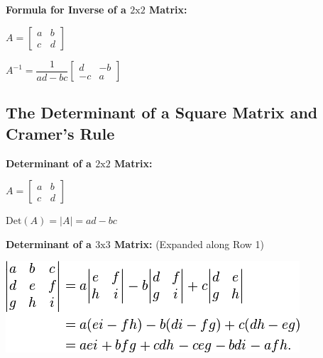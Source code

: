 \documentclass[12pt]{article}
\newenvironment{myindentpar}[1]%
     {\begin{list}{}%
             {\setlength{\leftmargin}{#1}}%
             \item[]%
     }
     {\end{list}}
\begin{document}
\newpage


\textbf{Formula for Inverse of a $2\text{x}2$ Matrix:}
\newline

\begin{myindentpar}{1cm}
\vspace{.5cm}
\centerline{
$ A = \begin{bmatrix}                                        
       a & b           \\[.5em]			
       c& d   		
     \end{bmatrix}$}
\end{myindentpar}

\begin{myindentpar}{1cm}
\vspace{.5cm}
\centerline{
$A^{-1} = \dfrac{1}{ad-bc}\begin{bmatrix}                                        
       d & -b           \\[.5em]			
       -c& a   		
     \end{bmatrix}$}
\end{myindentpar}



\subsection{The Determinant of a Square Matrix and Cramer's Rule}

\textbf{Determinant of a $2\text{x}2$ Matrix:}
\newline

\begin{myindentpar}{1cm}
\vspace{.5cm}
\centerline{
$ A = \begin{bmatrix}                                        
       a & b           \\[.5em]			
       c& d   		
     \end{bmatrix}$}
\end{myindentpar}

\vspace{.5cm}
\centerline{$\text{Det}(A) = |A| = ad - bc$}

\textbf{Determinant of a $3\text{x}3$ Matrix:} (Expanded along Row 1)
\newline

\centerline{\includegraphics[scale = 0.8]{DeterminantRow1.png}}
\end{document}
